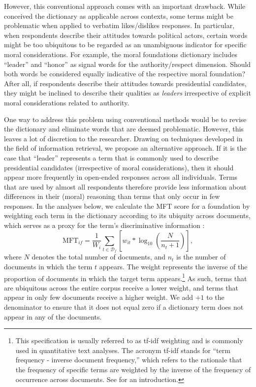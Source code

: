 \documentclass[12pt]{article}
\begin{document}
However, this conventional approach comes with an important drawback. While \citet{graham2009liberals} conceived the dictionary as applicable across contexts, some terms might be problematic when applied to verbatim likes/dislikes responses. In particular, when respondents describe their attitudes towards political actors, certain words might be too ubiquitous to be regarded as an unambiguous indicator for specific moral considerations. For example, the moral foundations dictionary includes ``leader'' and ``honor'' as signal words for the authority/respect dimension. Should both words be considered equally indicative of the respective moral foundation? After all, if respondents describe their attitudes towards presidential candidates, they might be inclined to describe their qualities as \textit{leaders} irrespective of explicit moral considerations related to authority.

One way to address this problem using conventional methods would be to revise the dictionary and eliminate words that are deemed problematic. However, this leaves a lot of discretion to the researcher. Drawing on techniques developed in the field of information retrieval, we propose an alternative approach. If it is the case that ``leader'' represents a term that is commonly used to describe presidential candidates (irrespective of moral considerations), then it should appear more frequently in open-ended responses across all individuals. Terms that are used by almost all respondents therefore provide less information about differences in their (moral) reasoning than terms that only occur in few responses. In the analyses below, we calculate the MFT score for a foundation by weighting each term in the dictionary according to its ubiquity across documents, which serves as a proxy for the term's discriminative information \citep[c.f. for example][]{manning2008introduction}:
\begin{equation}
\text{MFT}_{if} = \dfrac{1}{W_i} \sum_{t \in \mathcal{D}_f} \left[ w_{it} * \log_{10}\left( \dfrac{N}{n_t+1}\right) \right],
\end{equation}
where $N$ denotes the total number of documents, and $n_t$ is the number of documents in which the term $t$ appears. The weight represents the inverse of the proportion of documents in which the target term appears.\footnote{This specification is usually referred to as tf-idf weighting and is commonly used in quantitative text analyses. The acronym tf-idf stands for ``term frequency - inverse document frequency,'' which refers to the rationale that the frequency of specific terms are weighted by the inverse of the frequency of occurrence across documents. See \citet[ch. 6]{manning2008introduction} for an introduction.} As such, terms that are ubiquitous across the entire corpus receive a lower weight, and terms that appear in only few documents receive a higher weight. We add $+1$ to the denominator to ensure that it does not equal zero if a dictionary term does not appear in any of the documents.
\end{document}
